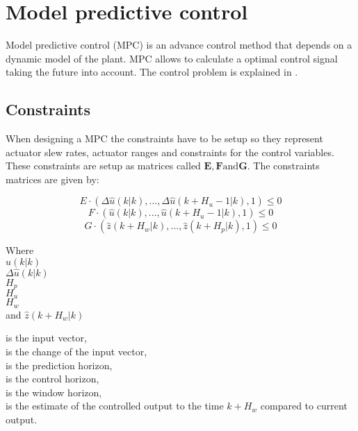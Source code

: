 \section{Model predictive control}

Model predictive control (MPC) is an advance control method that depends on a dynamic model of the plant. MPC allows to calculate a optimal control signal taking the future into account. The control problem is explained in .

\subsection{Constraints}

When designing a MPC the constraints have to be setup so they represent actuator slew rates, actuator ranges and constraints for the control variables. These constraints are setup as matrices called $\pmb{E}, \pmb{F} \text{and} \pmb{G}$. The constraints matrices are given by: 

\begin{equation}
E \cdot (\Delta\hat u(k|k),...,\Delta\hat u(k+H_u-1|k),1) \leq 0 
\label{eq:slewrate}
\end{equation}
\begin{equation}
F \cdot (\hat u(k|k),...,\hat u(k+H_u-1|k),1) \leq 0 
\label{eq:actranges}
\end{equation}
\begin{equation}
G \cdot (\hat z(k+H_w|k),...,\hat z(k+H_p|k),1) \leq 0
\label{eq:controlvar}
\end{equation}


 \begin{minipage}[t]{0.20\textwidth}
 Where\\
 \hspace*{8mm} $\hat u(k|k)$ \\
 \hspace*{8mm} $\Delta\hat u(k|k)$ \\
 \hspace*{8mm} $H_p$ \\
 \hspace*{8mm} $H_u$ \\
 \hspace*{8mm} $H_w$ \\
 and \hspace*{0.7mm} $\hat z(k+H_w|k)$	
 \end{minipage}
 \begin{minipage}[t]{0.68\textwidth}
 \vspace*{2mm}
 is the input vector, \\
 is the change of the input vector, \\
 is the prediction horizon,\\
 is the control horizon, \\
 is the window horizon, \\
 is the estimate of the controlled output to the time $k+H_w$ compared to current output.
 \end{minipage}

